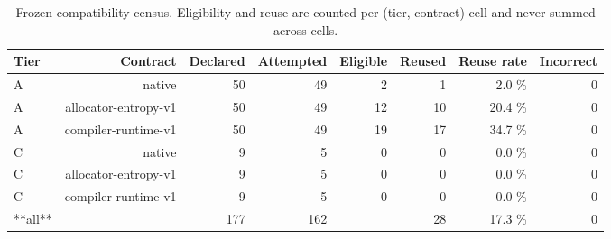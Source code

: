 \begin{table}[t]
\centering
\small
\caption{Frozen compatibility census. Eligibility and reuse are counted per (tier, contract) cell and never summed across cells.}
\label{tab:compatibility}
\begin{tabular}{lrrrrrrr}
\toprule
\textbf{Tier} & \textbf{Contract} & \textbf{Declared} & \textbf{Attempted} & \textbf{Eligible} & \textbf{Reused} & \textbf{Reuse rate} & \textbf{Incorrect} \\
\midrule
A & native & 50 & 49 & 2 & 1 & 2.0 \% & 0 \\
A & allocator-entropy-v1 & 50 & 49 & 12 & 10 & 20.4 \% & 0 \\
A & compiler-runtime-v1 & 50 & 49 & 19 & 17 & 34.7 \% & 0 \\
C & native & 9 & 5 & 0 & 0 & 0.0 \% & 0 \\
C & allocator-entropy-v1 & 9 & 5 & 0 & 0 & 0.0 \% & 0 \\
C & compiler-runtime-v1 & 9 & 5 & 0 & 0 & 0.0 \% & 0 \\
**all** &  & 177 & 162 &  & 28 & 17.3 \% & 0 \\
\bottomrule
\end{tabular}
\end{table}
